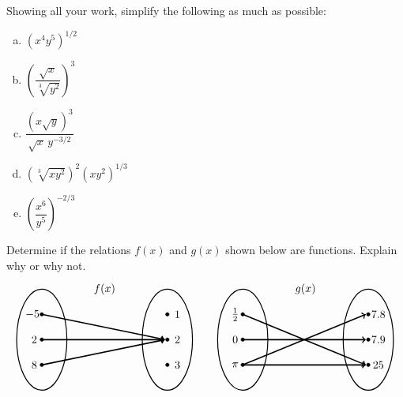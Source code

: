 \documentclass[11pt,letterpaper]{article}
\begin{document}
\prob Showing all your work, simplify the following as much as possible:
\begin{enumerate}[(a)]
\item $(x^4 y^5)^{1/2}$
\item $\left( \dfrac{\sqrt{x}}{\sqrt[3]{y^2}} \right)^3$
\item $\dfrac{(x \sqrt{y})^{3}}{\sqrt{x}\, y^{-3/2}}$
\item $(\sqrt[3]{x y^2})^2 (xy^2)^{1/3}$
\item $\left( \dfrac{x^6}{y^5} \right)^{-2/3}$
\end{enumerate} \pspace


\prob Determine if the relations $f(x)$ and $g(x)$ shown below are functions. Explain why or why not. 
	\[
	\begin{tikzpicture}[scale=0.8]
	\node at (2.5,2) {$f(x)$};
	\draw[line width=0.03cm] (0,0) circle (1 and 2);
	\draw[line width=0.03cm] (5,0) circle (1 and 2);
	
	\draw[fill=black] (0,1) circle (0.07);
	\draw[fill=black] (0,0) circle (0.07);
	\draw[fill=black] (0,-1) circle (0.07);
	
	\draw[fill=black] (5,1) circle (0.07);
	\draw[fill=black] (5,0) circle (0.07);
	\draw[fill=black] (5,-1) circle (0.07);
	
	\draw[line width=0.04cm,->] (0,1) -- (4.9,0);
	\draw[line width=0.04cm,->] (0,0) -- (4.9,0);
	\draw[line width=0.04cm,->] (0,-1) -- (4.9,0);
	
	\node at (-0.3,1) {$\!\!-5$};
	\node at (-0.3,0) {$2$};
	\node at (-0.3,-1) {$8$};
	
	\node at (5.4,1) {$1$};
	\node at (5.4,0) {$2$};
	\node at (5.4,-1) {$3$};
	
	\tikzset{shift={(8,0)}}
	\node at (2.5,2) {$g(x)$};
	\draw[line width=0.03cm] (0,0) circle (1 and 2);
	\draw[line width=0.03cm] (5,0) circle (1 and 2);
	
	\draw[fill=black] (0,1) circle (0.07);
	\draw[fill=black] (0,0) circle (0.07);
	\draw[fill=black] (0,-1) circle (0.07);
	
	\draw[fill=black] (5,1) circle (0.07);
	\draw[fill=black] (5,0) circle (0.07);
	\draw[fill=black] (5,-1) circle (0.07);
	
	\draw[line width=0.04cm,->] (0,1) -- (4.9,-1);
	\draw[line width=0.04cm,->] (0,0) -- (4.9,0);
	\draw[line width=0.04cm,->] (0,-1) -- (4.9,1);
	\draw[line width=0.04cm,->] (0,-1) -- (4.9,-1);
	
	\node at (-0.3,1) {$\frac{1}{2}$};
	\node at (-0.3,0) {$0$};
	\node at (-0.3,-1) {$\pi$};
	
	\node at (5.4,1) {$7.8$};
	\node at (5.4,0) {$7.9$};
	\node at (5.4,-1) {$25$};
	\end{tikzpicture}
	\] \pspace
\end{document}

